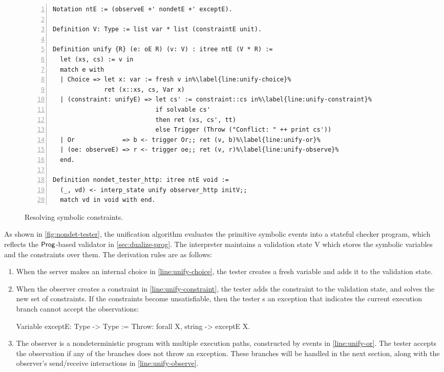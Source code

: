 \begin{figure}
\begin{lstlisting}[numbers=left]
Notation ntE := (observeE +' nondetE +' exceptE).

Definition V: Type := list var * list (constraintE unit).
  
Definition unify {R} (e: oE R) (v: V) : itree ntE (V * R) :=
  let (xs, cs) := v in
  match e with
  | Choice => let x: var := fresh v in%\label{line:unify-choice}%
              ret (x::xs, cs, Var x)
  | (constraint: unifyE) => let cs' := constraint::cs in%\label{line:unify-constraint}%
                            if solvable cs'
                            then ret (xs, cs', tt)
                            else Trigger (Throw ("Conflict: " ++ print cs'))
  | Or             => b <- trigger Or;; ret (v, b)%\label{line:unify-or}%
  | (oe: observeE) => r <- trigger oe;; ret (v, r)%\label{line:unify-observe}%
  end.

Definition nondet_tester_http: itree ntE void :=
  (_, vd) <- interp_state unify observer_http initV;;
  match vd in void with end.
\end{lstlisting}
\caption{Resolving symbolic constraints.}
\label{fig:nondet-tester}
\end{figure}

As shown in \autoref{fig:nondet-tester}, the unification algorithm evaluates the
primitive symbolic events into a stateful checker program, which reflects the
$\mathsf{Prog}$-based validator in \autoref{sec:dualize-prog}.  The interpreter
maintains a validation state \ilc V which stores the symbolic variables and the
constraints over them.  The derivation rules are as follows:
\begin{enumerate}
  \item When the server makes an internal choice in \autoref{line:unify-choice},
    the tester creates a fresh variable and adds it to the validation state.
  \item When the observer creates a constraint in
    \autoref{line:unify-constraint}, the tester adds the constraint to the
    validation state, and solves the new set of constraints.  If the constraints
    become unsatisfiable, then the tester s an exception that
    indicates the current execution branch cannot accept the observations:
\begin{coq}
  Variable exceptE: Type -> Type :=
    Throw: forall {X}, string -> exceptE X.
\end{coq}
  \item The observer is a nondeterministic program with multiple execution
    paths, constructed by  events in \autoref{line:unify-or}.  The
    tester accepts the observation if any of the branches does not throw an
    exception.  These branches will be handled in the next section, along with
    the observer's send/receive interactions in \autoref{line:unify-observe}.
\end{enumerate}

